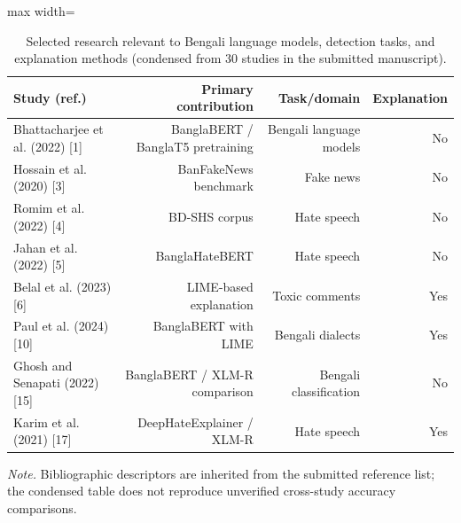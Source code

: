 \begin{table}[t]
\centering
\caption{Selected research relevant to Bengali language models, detection tasks, and explanation methods (condensed from 30 studies in the submitted manuscript).}
\label{tab:litreview}
\footnotesize
\begin{adjustbox}{max width=\linewidth}
\begin{tabular}{lrrr}
\toprule
Study (ref.) & Primary contribution & Task/domain & Explanation \\
\midrule
Bhattacharjee et al. (2022) [1] & BanglaBERT / BanglaT5 pretraining & Bengali language models & No \\
Hossain et al. (2020) [3] & BanFakeNews benchmark & Fake news & No \\
Romim et al. (2022) [4] & BD-SHS corpus & Hate speech & No \\
Jahan et al. (2022) [5] & BanglaHateBERT & Hate speech & No \\
Belal et al. (2023) [6] & LIME-based explanation & Toxic comments & Yes \\
Paul et al. (2024) [10] & BanglaBERT with LIME & Bengali dialects & Yes \\
Ghosh and Senapati (2022) [15] & BanglaBERT / XLM-R comparison & Bengali classification & No \\
Karim et al. (2021) [17] & DeepHateExplainer / XLM-R & Hate speech & Yes \\
\bottomrule
\end{tabular}
\end{adjustbox}
\par\vspace{2pt}
\begin{minipage}{\linewidth}
\scriptsize\emph{Note.} Bibliographic descriptors are inherited from the submitted reference list; the condensed table does not reproduce unverified cross-study accuracy comparisons.
\end{minipage}
\end{table}
